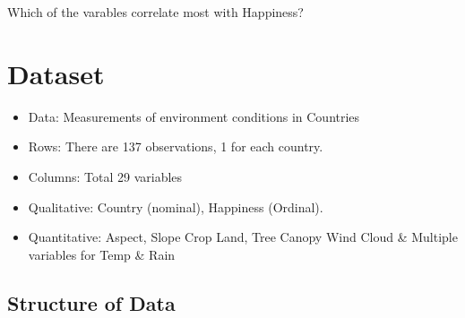 \documentclass[]{book}
\providecommand{\tightlist}{%
  \setlength{\itemsep}{0pt}\setlength{\parskip}{0pt}}
\begin{document}
Which of the varables correlate most with Happiness?

\hypertarget{dataset}{%
\chapter{Dataset}\label{dataset}}

\begin{itemize}
\tightlist
\item
  Data: Measurements of environment conditions in Countries
\item
  Rows: There are 137 observations, 1 for each country.
\item
  Columns: Total 29 variables
\item
  Qualitative: Country (nominal), Happiness (Ordinal).
\item
  Quantitative: Aspect, Slope Crop Land, Tree Canopy Wind Cloud \&
  Multiple variables for Temp \& Rain
\end{itemize}

\hypertarget{structure-of-data}{%
\section{Structure of Data}\label{structure-of-data}}
\end{document}
